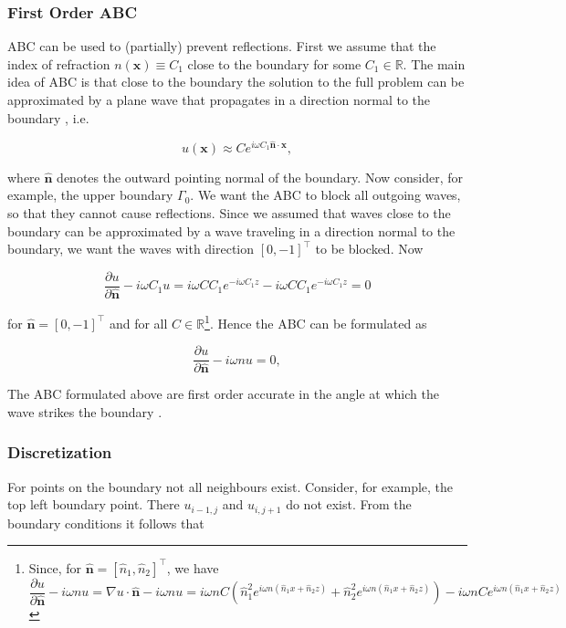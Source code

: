 \documentclass[10pt,a4paper]{article}
\newcommand{\x}{\mathbf{x}}
\newcommand{\n}{\mathbf{n}}
\begin{document}
\subsubsection{First Order ABC}
ABC can be used to (partially) prevent reflections. First we assume that the index of refraction $n(\x)\equiv C_1$ close to the boundary for some $C_1\in \mathbb{R}$. The main idea of ABC is that close to the boundary the solution to the full problem can be approximated by a plane wave that propagates in a direction normal to the boundary \cite{LectNotes}, i.e.

\begin{equation}
u(\x) \approx Ce^{i\omega C_1 \hat{\n}\cdot \x},
\end{equation}

where $\hat{\n}$ denotes the outward pointing normal of the boundary. Now consider, for example, the upper boundary $\Gamma_0$. We want the ABC to block all outgoing waves, so that they cannot cause reflections. Since we assumed that waves close to the boundary can be approximated by a wave traveling in a direction normal to the boundary, we want the waves with direction $[0,-1]^\top$ to be blocked. Now

\begin{equation}
\frac{\partial u}{\partial \hat{\n}} -i\omega C_1 u = i\omega CC_1e^{-i\omega C_1z} - i\omega CC_1e^{-i \omega C_1 z} = 0
\end{equation}

for $\hat{\n}=[0,-1]^\top$ and for all $C\in\mathbb{R}$\footnote{Since, for $\hat{\n} = [\hat{n}_1,\hat{n}_2]^\top$, we have 
	\begin{equation*}
	\frac{\partial u}{\partial \hat{\n}} -i\omega nu= \nabla u\cdot \hat{\n} -i\omega nu= i\omega nC (\hat{n}_1^2 e^{i\omega n(\hat{n}_1x+\hat{n}_2z)} + \hat{n}_2^2e^{i\omega n(\hat{n}_1x+\hat{n}_2z)})-i\omega nCe^{i\omega n(\hat{n}_1x+\hat{n}_2z)}
	\end{equation*}}. Hence the ABC can be formulated as

\begin{equation}
\frac{\partial u}{\partial \hat{\n}} - i\omega nu=0,
\end{equation}

The ABC formulated above are first order accurate in the angle at which the wave strikes the boundary \cite{AbsorpationRates}.

\subsubsection{Discretization}
For points on the boundary not all neighbours exist. Consider, for example, the top left boundary point. There $u_{i-1,j}$ and $u_{i,j+1}$ do not exist. From the boundary conditions it follows that
\end{document}
